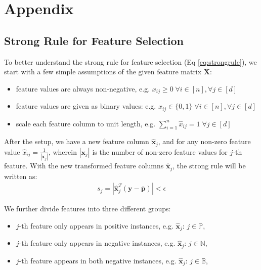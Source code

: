 \section{Appendix}

\subsection{Strong Rule for Feature Selection}\label{appendix:feature_selection}

To better understand the strong rule for feature selection (Eq \ref{eq:strongrule}), we start with a few simple assumptions of the given feature matrix $\pmb{X}$:
\begin{itemize}
    \item feature values are always non-negative, e.g. $x_{ij} \geq 0 \; \forall i\in[n], \forall j\in[d]$
    \item feature values are given as binary values: e.g. $x_{ij} \in \{0, 1\} \; \forall i\in[n], \forall j\in[d]$
    \item scale each feature column to unit length, e.g. $\sum_{i=1}^n \hat{x}_{ij} = 1\; \forall j \in [d]$
\end{itemize}

After the setup, we have a new feature column $\hat{\pmb{x}}_{j}$, and for any non-zero feature value $\hat{x}_{ij} = \frac{1}{|\pmb{x}_j|}$, wherein $|\pmb{x}_j|$ is the number of non-zero feature values for $j$-th feature. With the new transformed feature columns $\hat{\pmb{x}}_j$, the strong rule will be written as:
\begin{align}
    s_j = |\hat{\pmb{x}}_j^T (\pmb{y} - \pmb{\bar{p}})| < \epsilon
    \label{appendix_eq:strongrule}
\end{align}

We further divide features into three different groups:
\begin{itemize}
     \item $j$-th feature only appears in positive instances, e.g. $\hat{\pmb{x}}_j$: $ j \in \mathbb{P}$,
    \item $j$-th feature only appears in negative instances, e.g. $\hat{\pmb{x}}_j$: $ j \in \mathbb{N}$,
    \item $j$-th feature appears in both negative instances, e.g. $\hat{\pmb{x}}_j$: $ j \in \mathbb{B}$,
\end{itemize}

